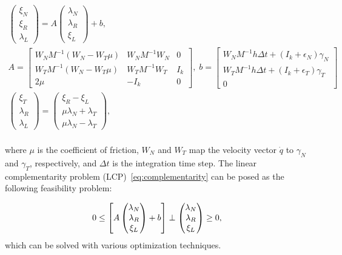 \begin{gather*}
  \begin{pmatrix}
    \xi_N \\
    \xi_R \\
    \lambda_L
  \end{pmatrix} =
      A
    \begin{pmatrix}
      \lambda_N \\
      \lambda_R \\
      \xi_L
    \end{pmatrix} + b, \\
    A = \begin{bmatrix}
      W_N M^{-1} (W_N - W_T \mu) & W_N M^{-1} W_N & 0  \\
      W_T M^{-1} (W_N - W_T \mu) & W_T M^{-1} W_T & I_k  \\
      2\mu & -I_k & 0
    \end{bmatrix}, \;  b = \begin{bmatrix}
      W_N M^{-1} h \Delta t + (I_k+\epsilon_N) \gamma_N\\
      W_T M^{-1} h \Delta t + (I_k+\epsilon_T) \gamma_T\\
      0
    \end{bmatrix} \\
    \begin{pmatrix}
      \xi_T   \\
      \lambda_R \\
      \lambda_L 
    \end{pmatrix} = 
    \begin{pmatrix}
      \xi_R - \xi_L \\
      \mu \lambda_N + \lambda_T  \\
      \mu \lambda_N - \lambda_T  
    \end{pmatrix}, \\
\end{gather*}
 
\noindent where $\mu$ is the coefficient of friction, $W_N$ and $W_T$ map the
velocity vector $\dot{q}$ to $\gamma_N$ and $\gamma_T$, respectively, and
$\Delta t$ is the integration time step.
%
The linear complementarity problem (LCP)~\eqref{eq:complementarity} can be posed as
the following feasibility problem:

\begin{equation}
    0 \leq 
    \left[ A \begin{pmatrix}
      \lambda_N \\
      \lambda_R \\
      \xi_L
    \end{pmatrix} + b \right]
    \perp
    \begin{pmatrix}
      \lambda_N \\
      \lambda_R \\
      \xi_L
    \end{pmatrix} \geq 0, \\
  \label{eq:feasibility} 
\end{equation}
\noindent which can be solved with various optimization techniques. 


